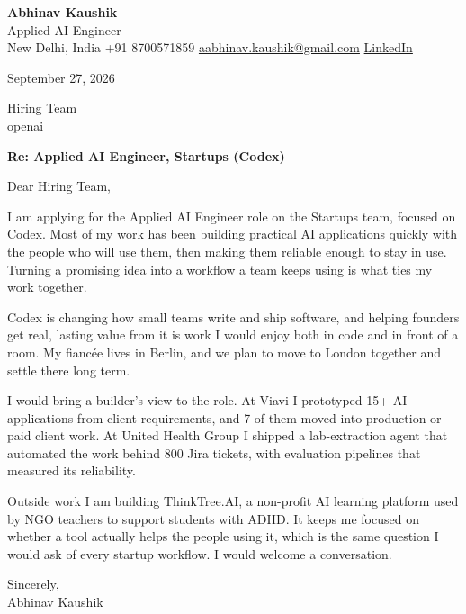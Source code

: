 \documentclass[11pt,a4paper]{article}
\begin{document}
{\Large\bfseries Abhinav Kaushik}\\
Applied AI Engineer\\
New Delhi, India \textbar{} +91 8700571859 \textbar{} \href{mailto:aabhinav.kaushik@gmail.com}{aabhinav.kaushik@gmail.com} \textbar{} \href{https://www.linkedin.com/in/abhinav-kaushik10/}{LinkedIn}  

September 27, 2026

Hiring Team\\
openai

\textbf{Re: Applied AI Engineer, Startups (Codex)}

Dear Hiring Team,

I am applying for the Applied AI Engineer role on the Startups team, focused on Codex. Most of my work has been building practical AI applications quickly with the people who will use them, then making them reliable enough to stay in use. Turning a promising idea into a workflow a team keeps using is what ties my work together.

Codex is changing how small teams write and ship software, and helping founders get real, lasting value from it is work I would enjoy both in code and in front of a room. My fiancée lives in Berlin, and we plan to move to London together and settle there long term.

I would bring a builder's view to the role. At Viavi I prototyped 15+ AI applications from client requirements, and 7 of them moved into production or paid client work. At United Health Group I shipped a lab-extraction agent that automated the work behind 800 Jira tickets, with evaluation pipelines that measured its reliability.

Outside work I am building ThinkTree.AI, a non-profit AI learning platform used by NGO teachers to support students with ADHD. It keeps me focused on whether a tool actually helps the people using it, which is the same question I would ask of every startup workflow. I would welcome a conversation.

Sincerely,\\[4pt]
Abhinav Kaushik
\end{document}
